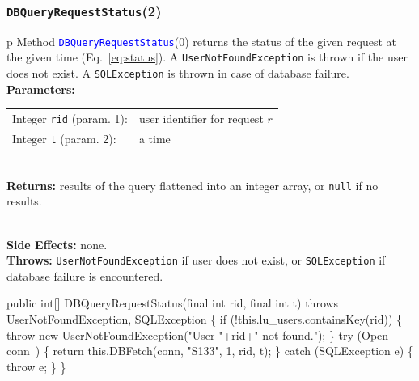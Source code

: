 \documentclass{article}
\def\nwendcode{\endtrivlist \endgroup}      %
\let\nwdocspar=\par
\theoremstyle{definition}                   %
\begin{document}
\subsubsection{{\tt{}\protect{}DBQueryRequestStatus}(2)}
\begin{tabular}{p{\textwidth}}
\toprule
{}
Method \textcolor{blue}{{\tt{}\protect{}DBQueryRequestStatus}}(0) returns the status of
the given request at the given time (Eq.~\ref{eq:status}).
A {\tt{}UserNotFoundException} is thrown if the user does not exist.
A {\tt{}SQLException} is thrown in case of database failure.\\
\midrule
\textbf{Parameters:} \\
\begin{tabular}{lp{116mm}}
Integer {\tt{}rid} (param. 1):&user identifier for request $r$\\
Integer {\tt{}t} (param. 2):&a time
\end{tabular}\\
\textbf{Returns:} results of the query flattened into an integer array, or
{\tt{}null} if no results.

\\
\textbf{Side Effects:} none.\\
\textbf{Throws:} {\tt{}UserNotFoundException} if user does not exist, or
{\tt{}SQLException} if database failure is encountered.\\
\bottomrule
\end{tabular}
\nwenddocs{}\endmoddef{}
public int[] DBQueryRequestStatus(final int rid, final int t)
throws UserNotFoundException, SQLException \{
  if (!this.lu_users.containsKey(rid)) \{
    throw new UserNotFoundException("User "+rid+" not found.");
  \}
  try (\LA{}Open \code{}conn\edoc{}~{\nwtagstyle{}}\RA{}) \{
    return this.DBFetch(conn, "S133", 1, rid, t);
  \} catch (SQLException e) \{
    throw e;
  \}
\}
\eatline
{}\nwendcode{}\nwdocspar
\end{document}
